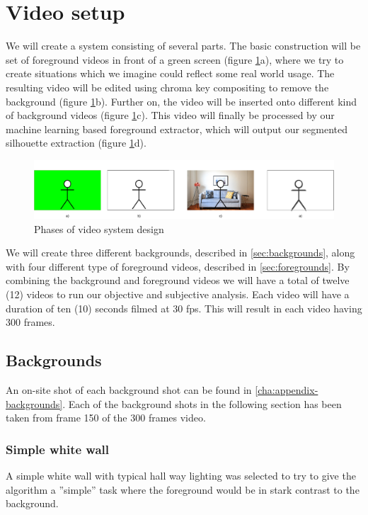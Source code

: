 \section{Video setup}
We will create a system consisting of several parts. The basic construction will be set of foreground videos in front of a green screen (figure \ref{fig:videos}a), where we try to create situations which we imagine could reflect some real world usage. The resulting video will be edited using chroma key compositing to remove the background (figure \ref{fig:videos}b). Further on, the video will be inserted onto different kind of background videos (figure \ref{fig:videos}c). This video will finally be processed by our machine learning based foreground extractor, which will output our segmented silhouette extraction (figure \ref{fig:videos}d). 

\begin{figure}[H]
  \centering
  \includegraphics[width=\textwidth]{img/video_setup/video_system_design.pdf}
  \caption{Phases of video system design}
  \label{fig:videos}
\end{figure}

We will create three different backgrounds, described in \autoref{sec:backgrounds}, along with four different type of foreground videos, described in \autoref{sec:foregrounds}. By combining the background and foreground videos we will have a total of twelve (12) videos to run our objective and subjective analysis. Each video will have a duration of ten (10) seconds filmed at 30 fps. This will result in each video having 300 frames.

\subsection{Backgrounds}\label{sec:backgrounds}

An on-site shot of each background shot can be found in \autoref{cha:appendix-backgrounds}. Each of the background shots in the following section has been taken from frame 150 of the 300 frames video.

\subsubsection{Simple white wall}
A simple white wall with typical hall way lighting was selected to try to give the algorithm a ''simple'' task where the foreground would be in stark contrast to the background.

